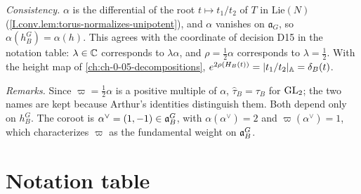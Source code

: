 \begin{definition}
\end{definition}
\noindent\emph{Consistency.} $\alpha$ is the differential of the root $t\mapsto t_1/t_2$ of $T$ in $\mathrm{Lie}(N)$ (\cref{I.conv.lem:torus-normalizes-unipotent}),
and $\alpha$ vanishes on $\mathfrak a_G$, so $\alpha(h_B^G)=\alpha(h)$. This agrees with the coordinate of decision D15 in
the notation table: $\lambda\in\mathbb{C}$ corresponds to $\lambda\alpha$, and $\rho=\frac12\alpha$ corresponds to $\lambda=\frac12$.
With the height map of \cref{ch:ch-0-05-decompositions}, $e^{2\rho(H_B(t))}=\lvert t_1/t_2\rvert_{\mathbb{A}}=\delta_B(t)$.

\begin{definition}
\end{definition}
\noindent\emph{Remarks.} Since $\varpi=\frac12\alpha$ is a positive multiple of $\alpha$, $\hat\tau_B=\tau_B$ for $\mathrm{GL}_2$; the two
names are kept because Arthur's identities \cite[§§5--8]{AIntro} distinguish them. Both depend only on $h_B^G$. The
coroot is $\alpha^\vee=(1,-1)\in\mathfrak{a}_B^G$, with $\alpha(\alpha^\vee)=2$ and $\varpi(\alpha^\vee)=1$, which characterizes
$\varpi$ as the fundamental weight on $\mathfrak{a}_B^G$.

\section{Notation table}

